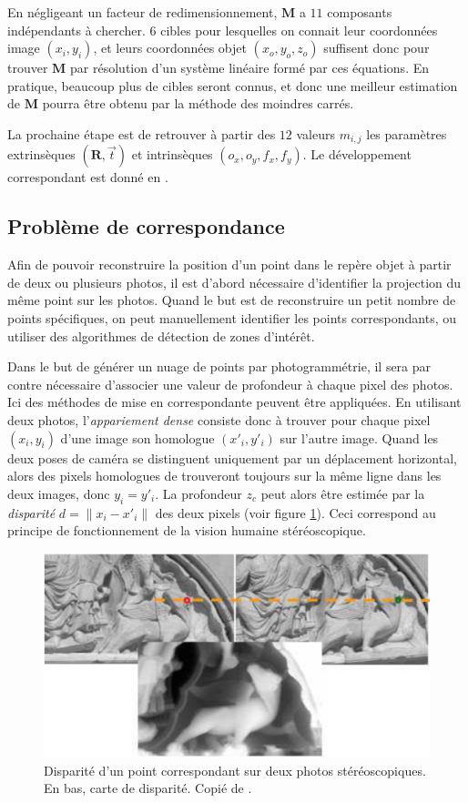 \documentclass[a4paper,10pt]{scrreprt}
\begin{document}
En négligeant un facteur de redimensionnement, $\mathbf{M}$ a $11$ composants indépendants à chercher. $6$ cibles pour lesquelles on connait leur coordonnées image $(x_i, y_i)$, et leurs coordonnées objet $(x_o, y_o, z_o)$ suffisent donc pour trouver $\mathbf{M}$ par résolution d'un système linéaire formé par ces équations. En pratique, beaucoup plus de cibles seront connus, et donc une meilleur estimation de $\mathbf{M}$ pourra être obtenu par la méthode des moindres carrés.

La prochaine étape est de retrouver à partir des $12$ valeurs $m_{i,j}$ les paramètres extrinsèques $(\mathbf{R}, \vec{t})$ et intrinsèques $(o_x, o_y, f_x, f_y)$. Le développement correspondant est donné en \cite{Trus1998}.

\subsection{Problème de correspondance}
Afin de pouvoir reconstruire la position d'un point dans le repère objet à partir de deux ou plusieurs photos, il est d'abord nécessaire d'identifier la projection du même point sur les photos. Quand le but est de reconstruire un petit nombre de points spécifiques, on peut manuellement identifier les points correspondants, ou utiliser des algorithmes de détection de zones d'intérêt.

Dans le but de générer un nuage de points par photogrammétrie, il sera par contre nécessaire d'associer une valeur de profondeur à chaque pixel des photos. Ici des méthodes de mise en correspondante peuvent être appliquées. En utilisant deux photos, l'\emph{appariement dense} consiste donc à trouver pour chaque pixel $(x_i, y_i)$ d'une image son homologue $(x'_i, y'_i)$ sur l'autre image. Quand les deux poses de caméra se distinguent uniquement par un déplacement horizontal, alors des pixels homologues de trouveront toujours sur la même ligne dans les deux images, donc $y_i = y'_i$. La profondeur $z_c$ peut alors être estimée par la \emph{disparité} $d = \| x_i - x'_i \|$ des deux pixels (voir figure \ref{fig:disparity}). \cite{Gard2009} Ceci correspond au principe de fonctionnement de la vision humaine stéréoscopique.

\begin{figure}[p]
\center
\includegraphics[width=.7\textwidth]{disparity.png}
\caption{Disparité d'un point correspondant sur deux photos stéréoscopiques. En bas, carte de disparité. Copié de \cite{Gard2009}.}
\label{fig:disparity}
\end{figure}
\end{document}
